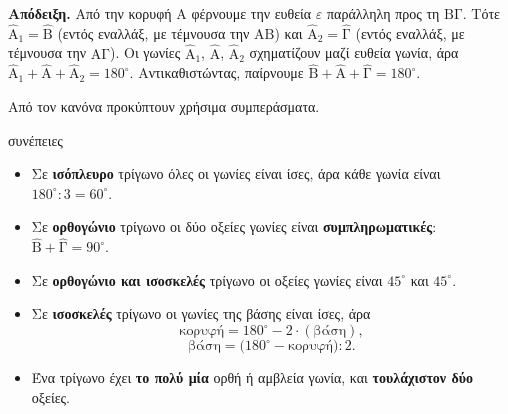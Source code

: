 \begin{center}
\end{center}

\textbf{Απόδειξη.} Από την κορυφή $\mathrm{Α}$ φέρνουμε την ευθεία $\varepsilon$ παράλληλη προς τη $\mathrm{ΒΓ}$. Τότε $\hat{\mathrm{Α}}_1=\hat{\mathrm{Β}}$ (εντός εναλλάξ, με τέμνουσα την $\mathrm{ΑΒ}$) και $\hat{\mathrm{Α}}_2=\hat{\mathrm{Γ}}$ (εντός εναλλάξ, με τέμνουσα την $\mathrm{ΑΓ}$). Οι γωνίες $\hat{\mathrm{Α}}_1$, $\hat{\mathrm{Α}}$, $\hat{\mathrm{Α}}_2$ σχηματίζουν μαζί ευθεία γωνία, άρα $\hat{\mathrm{Α}}_1+\hat{\mathrm{Α}}+\hat{\mathrm{Α}}_2=180^\circ$. Αντικαθιστώντας, παίρνουμε $\hat{\mathrm{Β}}+\hat{\mathrm{Α}}+\hat{\mathrm{Γ}}=180^\circ$.

Από τον κανόνα προκύπτουν χρήσιμα συμπεράσματα.

\begin{idiotita}{συνέπειες}
\begin{itemize}[leftmargin=1.2em,itemsep=0.3ex,topsep=2pt]
\item Σε \textbf{ισόπλευρο} τρίγωνο όλες οι γωνίες είναι ίσες, άρα κάθε γωνία είναι $180^\circ:3=60^\circ$.
\item Σε \textbf{ορθογώνιο} τρίγωνο οι δύο οξείες γωνίες είναι \textbf{συμπληρωματικές}: $\hat{\mathrm{Β}}+\hat{\mathrm{Γ}}=90^\circ$.
\item Σε \textbf{ορθογώνιο και ισοσκελές} τρίγωνο οι οξείες γωνίες είναι $45^\circ$ και $45^\circ$.
\item Σε \textbf{ισοσκελές} τρίγωνο οι γωνίες της βάσης είναι ίσες, άρα
\[\text{κορυφή}=180^\circ-2\cdot(\text{βάση}),\]
\[\text{βάση}=\bigl(180^\circ-\text{κορυφή}\bigr):2.\]
\item Ένα τρίγωνο έχει \textbf{το πολύ μία} ορθή ή αμβλεία γωνία, και \textbf{τουλάχιστον δύο} οξείες.
\end{itemize}
\end{idiotita}

